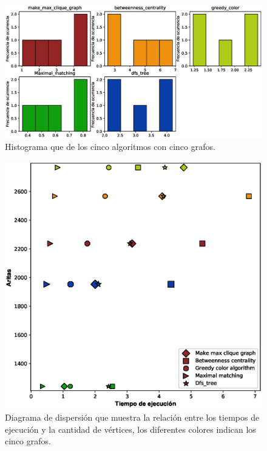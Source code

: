 \documentclass{article}
\begin{document}
\begin{figure}[h]
\includegraphics[scale=0.6]{Histograma.eps}
\caption{Histograma que de los cinco algoritmos con cinco grafos.}
\end{figure}
\begin{figure}[h]
\includegraphics[scale=0.7]{DiagramAristas.eps}
\caption{Diagrama de dispersión que muestra la relación entre los tiempos de ejecución y la cantidad de vértices, los diferentes colores indican los cinco grafos.}
\end{figure}
\end{document}
